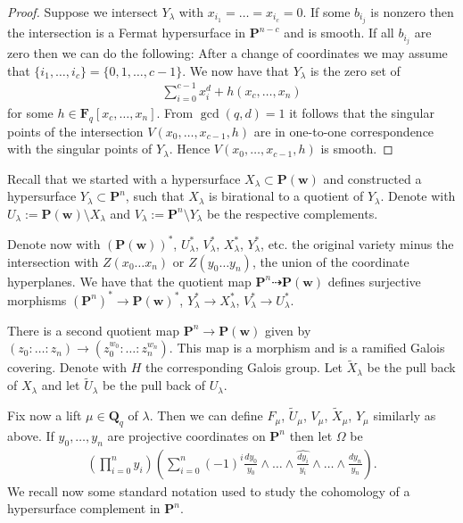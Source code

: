 \begin{proof} Suppose we intersect $Y_{\lambda}$ with $x_{i_1}=\dots=x_{i_c}=0$. If some $b_{i_j}$ is nonzero then the inter\-section is a Fermat hypersurface in $\mathbf{P}^{n-c}$ and is smooth. If all $b_{i_j}$ are zero then we can do the following: After a change of coordinates we may assume that $\{i_1,\dots,i_{c}\}=\{0,1,\dots,c-1\}$. We now have that $Y_{\lambda}$ is the zero set of
\begin{gather*} \sum_{i=0}^{c-1} x_i^d+h(x_c,\dots,x_n)\end{gather*}
for some $h\in \mathbf{F}_q[x_c,\dots,x_n]$. From $\gcd(q,d)=1$ it follows that the singular points of the intersection $V(x_0,\dots,x_{c-1},h)$ are in one-to-one correspondence with the singular points of $Y_\lambda$. Hence $V(x_0,\dots,x_{c-1},h)$ is smooth.
\end{proof}

Recall that we started with a hypersurface $X_\lambda \subset \mathbf{P}(\mathbf{w})$ and constructed a hypersurface $Y_{\lambda}\subset \mathbf{P}^n$, such that $X_\lambda$ is birational to a quotient of $Y_\lambda$. Denote with $U_{\lambda}:=\mathbf{P}(\mathbf{w})\setminus X_\lambda$ and $V_{\lambda}:=\mathbf{P}^n\setminus Y_\lambda$ be the respective complements.

Denote now with $(\mathbf{P}(\mathbf{w}))^*$, $U_{\lambda}^*$, $V_{\lambda}^*$, $X_{\lambda}^*$, $Y_\lambda^*$, etc. the original variety minus the intersection with $Z(x_0\dots x_n)$ or $Z(y_0 \dots y_n)$, the union of the coordinate hyperplanes. We have that the quotient map $\mathbf{P}^n \dashrightarrow \mathbf{P}(\mathbf{w})$ def\/ines surjective morphisms $(\mathbf{P}^n)^*\to \mathbf{P}(\mathbf{w})^*$, $Y_\lambda^*\to X_{\lambda}^*$, $V_\lambda^*\to U_\lambda^*$.

There is a second quotient map $\mathbf{P}^n \to \mathbf{P}(\mathbf{w})$ given by $(z_0:\dots:z_n) \to (z_0^{w_0}:\dots:z_n^{w_n})$. This map is a morphism and is a ramif\/ied Galois covering. Denote with $H$ the corresponding Galois group. Let $\tilde{X}_{\lambda}$ be the pull back of $X_\lambda$ and let $\tilde{U}_{\lambda}$ be the pull back of $U_{\lambda}$.

Fix now a lift $\mu\in \mathbf{Q}_q$ of $\lambda$. Then we can def\/ine $F_{\mu}$, $\tilde{U}_{\mu}$, $V_{\mu}$, $\tilde{ X}_{\mu}$, $Y_{\mu}$ similarly as above. If $y_0,\dots,y_n$ are projective coordinates on $\mathbf{P}^n$ then let $\Omega$ be
\begin{gather*} \left(\prod_{i=0}^n y_i\right) \left(\sum_{i=0}^n (-1)^{i} \frac{dy_0}{y_0} \wedge \dots \wedge \widehat{\frac{dy_i}{y_i} }\wedge\dots \wedge\frac{dy_n}{y_n} \right).\end{gather*}
We recall now some standard notation used to study the cohomology of a hypersurface complement in $\mathbf{P}^n$.

